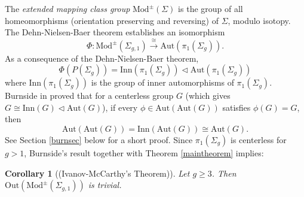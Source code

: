 \documentclass[a4paper]{amsproc}
\theoremstyle{TheoremNum}
\theoremstyle{Theorembold}
\newtheorem{cor}[thm]{Corollary}
\theoremstyle{TheoremboldDef}
\theoremstyle{TheoremboldRem}
\theoremstyle{TheoremboldRem}
\begin{document}
The \emph{extended mapping class group} ${\text{Mod}^\pm(\Sigma)}$ is the group of all homeomorphisms (orientation preserving and reversing) of $\Sigma$, modulo isotopy. The Dehn-Nielsen-Baer theorem establishes an isomorphism \[\Phi:{\text{Mod}^\pm(\Sigma_{g,1})}\stackrel{\cong}{\longrightarrow} \text{Aut}({\pi_1(\Sigma_g)}).\] As a consequence of the Dehn-Nielsen-Baer theorem, \[\Phi(P({\Sigma_{g}}))=\text{Inn}({\pi_1(\Sigma_g)})\triangleleft \text{Aut}({\pi_1(\Sigma_g)})\] where $\text{Inn}({\pi_1(\Sigma_g)})$ is the group of inner automorphisms of ${\pi_1(\Sigma_g)}$.  \\

Burnside in \cite[pp. 261]{burnside} proved that for a centerless group $G$ (which gives $G\cong\text{Inn}(G)\triangleleft\text{Aut}(G)$), if every $\phi\in \text{Aut}(\text{Aut}(G))$ satisfies $\phi(G)=G$, then \[\text{Aut}(\text{Aut}(G))=\text{Inn}(\text{Aut}(G))\cong \text{Aut}(G).\] See Section \ref{burnsec} below for a short proof. Since ${\pi_1(\Sigma_g)}$ is centerless for $g>1$, Burnside's result together with Theorem \ref{maintheorem} implies: \\ 

\begin{cor}[(Ivanov-McCarthy's Theorem)]\label{maincorollary}
Let $g{\geqslant} 3$. Then $\text{Out}({\text{Mod}^\pm(\Sigma_{g,1})})$ is trivial.
\end{cor}
\end{document}
